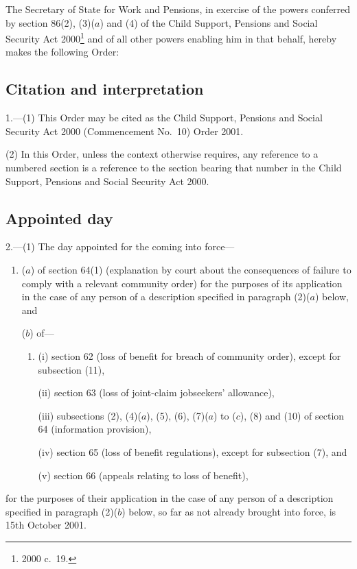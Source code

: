 \documentclass[12pt,a4paper]{article}
\title{\regstitle}
\author{S.I.\ 2001 No.\ 2619 (C.\ 86)}
\date{Made
18th July 2001\\
}
\begin{document}
\maketitle

\noindent
The Secretary of State for Work and Pensions, in exercise of the powers conferred by section 86(2), (3)($a$)  and (4) of the Child Support, Pensions and Social Security Act 2000\footnote{2000 c.\ 19.} and of all other powers enabling him in that behalf, hereby makes the following Order:  

{\sloppy

\tableofcontents

}

\bigskip

\setcounter{secnumdepth}{-2}

\subsection[1. Citation and interpretation]{Citation and interpretation}

1.---(1)  This Order may be cited as the Child Support, Pensions and Social Security Act 2000 (Commencement No.\ 10) Order 2001.

(2) In this Order, unless the context otherwise requires, any reference to a numbered section is a reference to the section bearing that number in the Child Support, Pensions and Social Security Act 2000.

\subsection[2. Appointed day]{Appointed day}

2.---(1)  The day appointed for the coming into force—
\begin{enumerate}\item[]
($a$) of section 64(1) (explanation by court about the consequences of failure to comply with a relevant community order) for the purposes of its application in the case of any person of a description specified in paragraph (2)($a$)  below, and

($b$) of—
\begin{enumerate}\item[]
(i) section 62 (loss of benefit for breach of community order), except for subsection (11),

(ii) section 63 (loss of joint-claim jobseekers' allowance),

(iii) subsections (2), (4)($a$), (5), (6), (7)($a$)  to ($c$), (8) and (10) of section 64 (information provision),

(iv) section 65 (loss of benefit regulations), except for subsection (7), and

(v) section 66 (appeals relating to loss of benefit),
\end{enumerate}
\end{enumerate}
for the purposes of their application in the case of any person of a description specified in paragraph (2)($b$)  below, so far as not already brought into force, is 15th October 2001.
\end{document}
